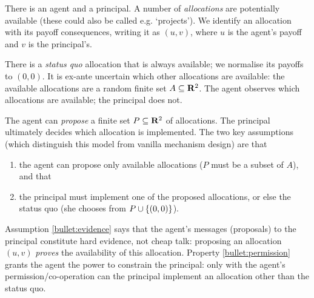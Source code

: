 






There is an agent and a principal.
A number of \emph{allocations} are potentially available
(these could also be called e.g. `projects').
We identify an allocation with its payoff consequences,
writing it as $(u,v)$, where $u$ is the agent's payoff and $v$ is the principal's.

There is a \emph{status quo} allocation that is always available; we normalise its payoffs to $(0,0)$.
It is ex-ante uncertain which other allocations are available:
the available allocations are a random finite set $A \subseteq \mathbf{R}^2$.
The agent observes which allocations are available; the principal does not.

The agent can \emph{propose} a finite set $P \subseteq \mathbf{R}^2$ of allocations.
The principal ultimately decides which allocation is implemented.
The two key assumptions (which distinguish this model from vanilla mechanism design) are that
%
\begin{enumerate}[label=(\alph*)]

	\item \label{bullet:evidence}
	the agent can propose only available allocations ($P$ must be a subset of $A$), and that

	\item \label{bullet:permission}
	the principal must implement one of the proposed allocations, or else the status quo (she chooses from $P \cup \{(0,0)\}$).

\end{enumerate}
%
Assumption \ref{bullet:evidence} says that the agent's messages (proposals) to the principal constitute hard evidence, not cheap talk: proposing an allocation $(u,v)$ \emph{proves} the availability of this allocation.
Property \ref{bullet:permission} grants the agent the power to constrain the principal: only with the agent's permission/co-operation can the principal implement an allocation other than the status quo.

